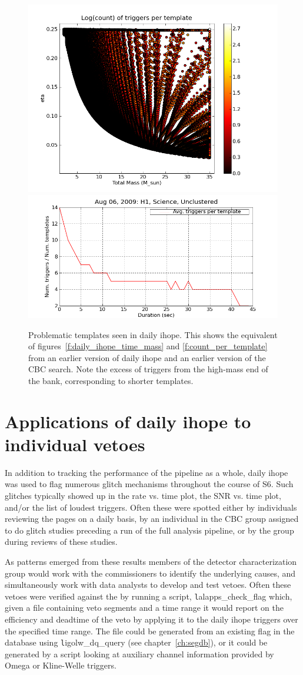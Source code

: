 \begin{figure}
  \includegraphics[width=0.5\linewidth]{figures/detchar/20090806_H1_0_UNCLUSTERED_template_counts}
  \includegraphics[width=0.5\linewidth]{figures/detchar/20090806_H1_0_UNCLUSTERED_mass_hist_norm}
  \caption[Problematic templates seen in daily ihope]{
  \label{f:daily_ihope_el_glitcho}
Problematic templates seen in daily ihope.  This shows the equivalent
of figures~\ref{f:daily_ihope_time_mass} and
\ref{f:count_per_template} from an earlier version of daily ihope and
an earlier version of the CBC search.  Note the excess of triggers
from the high-mass end of the bank, corresponding to shorter
templates.
}
\end{figure}%



\section{Applications of daily ihope to individual vetoes}

In addition to tracking the performance of the pipeline as a whole,
daily ihope was used to flag numerous glitch mechanisms throughout the
course of S6.  Such glitches typically showed up in the rate vs. time
plot, the SNR vs. time plot, and/or the list of loudest triggers.
Often these were spotted either by individuals reviewing the pages on
a daily basis, by an individual in the CBC group assigned  to do
glitch studies preceding a run of the full analysis pipeline, or by
the group during reviews of these studies.

As patterns emerged from these results members of the detector
characterization group would work with the commissioners to identify
the underlying causes, and simultaneously work with data analysts to
develop and test vetoes.  Often these vetoes were verified against the
by running a script, {\texttt lalapps\_check\_flag} which, given a
file containing veto segments and a time range it would report on the
efficiency and deadtime of the veto by applying it to the daily ihope
triggers over the specified time range.  The file could be generated
from an existing flag in the database using {\texttt
ligolw\_dq\_query} (see chapter~\ref{ch:segdb}), or it could be generated
by a script looking at auxiliary channel information provided by 
Omega or Kline-Welle triggers.

